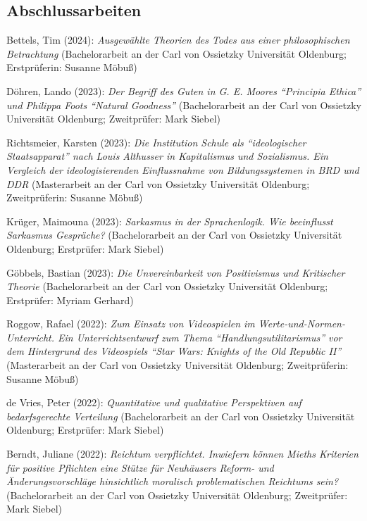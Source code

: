 \documentclass[a4paper,10pt]{article}
\newenvironment{literature}{%
   \parskip6pt\parindent0pt\raggedright
   \def\lititem{\hangindent=1cm\hangafter1}}{%
   \par\ignorespaces}
\begin{document}
\subsection*{Abschlussarbeiten}
\begin{literature}
\lititem Bettels, Tim (2024): \textit{Ausgewählte Theorien des Todes aus einer philosophischen Betrachtung} (Bachelorarbeit an der Carl von Ossietzky Universität Oldenburg; Erstprüferin: Susanne Möbuß)

\lititem Döhren, Lando (2023): \textit{Der Begriff des Guten in G. E. Moores \enquote{Principia Ethica} und Philippa Foots \enquote{Natural Goodness}} (Bachelorarbeit an der Carl von Ossietzky Universität Oldenburg; Zweitprüfer: Mark Siebel)

\lititem Richtsmeier, Karsten (2023): \textit{Die Institution Schule als \enquote{ideologischer Staatsapparat} nach Louis Althusser in Kapitalismus und Sozialismus. Ein Vergleich der ideologisierenden Einflussnahme von Bildungssystemen in BRD und DDR} (Masterarbeit an der Carl von Ossietzky Universität Oldenburg; Zweitprüferin: Susanne Möbuß)

\lititem Krüger, Maimouna (2023): \textit{Sarkasmus in der Sprachenlogik. Wie beeinflusst Sarkasmus Gespräche?} (Bachelorarbeit an der Carl von Ossietzky Universität Oldenburg; Erstprüfer: Mark Siebel)

\lititem Göbbels, Bastian (2023): \textit{Die Unvereinbarkeit von Positivismus und Kritischer Theorie} (Bachelorarbeit an der Carl von Ossietzky Universität Oldenburg; Erstprüfer: Myriam Gerhard)

\lititem Roggow, Rafael (2022): \textit{Zum Einsatz von Videospielen im Werte-und-Normen-Unterricht. Ein Unterrichtsentwurf zum Thema \enquote{Handlungsutilitarismus} vor dem Hintergrund des Videospiels \enquote{Star Wars: Knights of the Old Republic II}} (Masterarbeit an der Carl von Ossietzky Universität Oldenburg; Zweitprüferin: Susanne Möbuß)

\lititem de Vries, Peter (2022): \textit{Quantitative und qualitative Perspektiven auf bedarfsgerechte Verteilung} (Bachelorarbeit an der Carl von Ossietzky Universität Oldenburg; Erstprüfer: Mark Siebel)

\lititem Berndt, Juliane (2022): \textit{Reichtum verpflichtet. Inwiefern können Mieths Kriterien für positive Pflichten eine Stütze für Neuhäusers Reform- und Änderungsvorschläge hinsichtlich moralisch problematischen Reichtums sein?} (Bachelorarbeit an der Carl von Ossietzky Universität Oldenburg; Zweitprüfer: Mark Siebel)


\end{literature}
\end{document}
